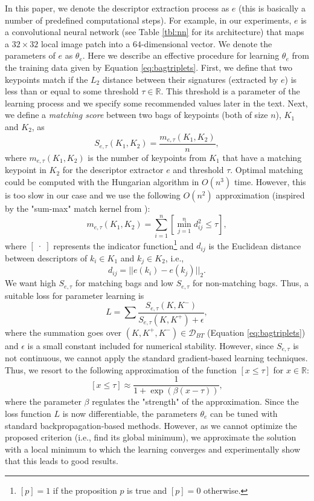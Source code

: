 \documentclass[twocolumn]{article}
\begin{document}
		In this paper, we denote the descriptor extraction process as $e$ (this is basically a number of predefined computational steps).
		For example, in our experiments, $e$ is a convolutional neural network (see Table \ref{tbl:nn} for its architecture) that maps a $32\times 32$ local image patch into a $64$-dimensional vector.
		We denote the parameters of $e$ as $\theta_e$.
		Here we describe an effective procedure for learning $\theta_e$ from the training data given by Equation \eqref{eq:bagtriplets}.
		First, we define that two keypoints match if the $L_2$ distance between their signatures (extracted by $e$) is less than or equal to some threshold $\tau\in\mathbb{R}$.
		This threshold is a parameter of the learning process and we specify some recommended values later in the text.
		Next, we define a \emph{matching score} between two bags of keypoints (both of size $n$), $K_1$ and $K_2$, as
		\begin{equation}\label{eq:bagsim}
			S_{e, \tau}(K_1, K_2)=
			\frac{m_{e, \tau}(K_1, K_2)}{n}
			,
		\end{equation}
		where $m_{e, \tau}(K_1, K_2)$ is the number of keypoints from $K_1$ that have a matching keypoint in $K_2$ for the descriptor extractor $e$ and threshold $\tau$.
		Optimal matching could be computed with the Hungarian algorithm in $O(n^3)$ time.
		However, this is too slow in our case and we use the following $O(n^2)$ approximation
		(inspired by the "sum-max" match kernel from \cite{summax}):
		$$
			m_{e, \tau}(K_1, K_2)=
			\sum_{i=1}^n \left[ \min_{j=1}^n d_{ij}^2 \leq \tau \right]
			,
		$$
		where $[\;\cdot\;]$ represents the indicator function\footnote{$[p]=1$ if the proposition $p$ is true and $[p]=0$ otherwise.} and $d_{ij}$ is the Euclidean distance between descriptors of $k_i\in K_1$ and $k_j\in K_2$, i.e.,
		$$
			d_{ij} =
			|| e(k_i) - e(k_j) ||_2
			.
		$$
		We want high $S_{e, \tau}$ for matching bags and low $S_{e, \tau}$ for non-matching bags.
		Thus, a suitable loss for parameter learning is
		\begin{equation}\label{eq:loss}
			L=
			\sum\frac{S_{e, \tau}(K, K^-)}{S_{e, \tau}(K, K^+) + \epsilon}
			,
		\end{equation}
		where the summation goes over $(K, K^+, K^-)\in\mathcal{D}_{BT}$ (Equation \eqref{eq:bagtriplets}) and $\epsilon$ is a small constant included for numerical stability.
		However, since $S_{e, \tau}$ is not continuous, we cannot apply the standard gradient-based learning techniques.
		Thus, we resort to the following approximation of the function $[x\leq\tau]$ for $x\in\mathbb{R}$:
		$$
			[x\leq\tau]\approx
			\frac{1}{1 + \exp(\beta(x-\tau))}
			,
		$$
		where the parameter $\beta$ regulates the "strength" of the approximation.
		Since the loss function $L$ is now differentiable, the parameters $\theta_e$ can be tuned with standard backpropagation-based methods.
		However, as we cannot optimize the proposed criterion (i.e., find its global minimum), we approximate the solution with a local minimum to which the learning converges and experimentally show that this leads to good results.
\end{document}
